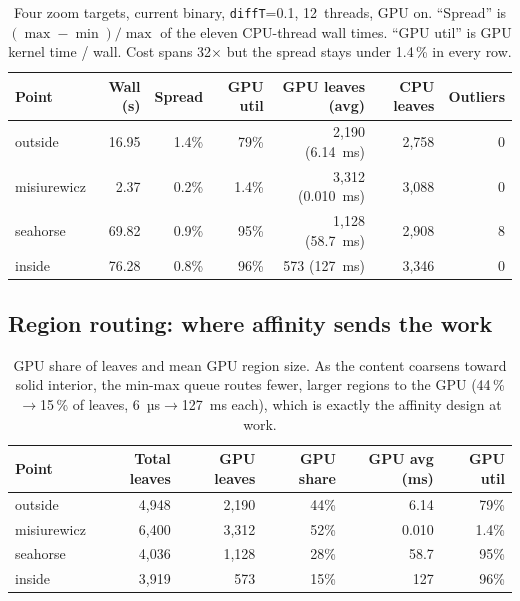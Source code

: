 \documentclass[
	english,
	letterpaper, oneside
]{article}
\begin{document}
\begin{table}[H]
    \centering
    \caption{Four zoom targets, current binary, \texttt{diffT}=0.1, 12~threads,
             GPU on. ``Spread'' is $(\max-\min)/\max$ of the eleven CPU-thread
             wall times. ``GPU util'' is GPU kernel time / wall. Cost spans
             32$\times$ but the spread stays under 1.4\,\% in every row.}
    \label{tab:char}
    \begin{tabular}{lrrrrrr}
        \hline
        Point & Wall (s) & Spread & GPU util
            & GPU leaves (avg) & CPU leaves & Outliers \\
        \hline
        outside     & 16.95 & 1.4\% & 79\%  & 2{,}190 (6.14~ms)  & 2{,}758 & 0 \\
        misiurewicz &  2.37 & 0.2\% & 1.4\% & 3{,}312 (0.010~ms) & 3{,}088 & 0 \\
        seahorse    & 69.82 & 0.9\% & 95\%  & 1{,}128 (58.7~ms)  & 2{,}908 & 8 \\
        inside      & 76.28 & 0.8\% & 96\%  &   573 (127~ms)    & 3{,}346 & 0 \\
        \hline
    \end{tabular}
\end{table}

\subsection{Region routing: where affinity sends the work}

\begin{table}[H]
    \centering
    \caption{GPU share of leaves and mean GPU region size. As the content
             coarsens toward solid interior, the min-max queue routes
             fewer, larger regions to the GPU (44\,\%$\to$15\,\% of leaves,
             6~µs$\to$127~ms each), which is exactly the affinity design at work.}
    \label{tab:route}
    \begin{tabular}{lrrrrr}
        \hline
        Point & Total leaves & GPU leaves
            & GPU share & GPU avg (ms) & GPU util \\
        \hline
        outside     & 4{,}948 & 2{,}190 & 44\% & 6.14  & 79\%  \\
        misiurewicz & 6{,}400 & 3{,}312 & 52\% & 0.010 & 1.4\% \\
        seahorse    & 4{,}036 & 1{,}128 & 28\% & 58.7  & 95\%  \\
        inside      & 3{,}919 &   573   & 15\% & 127   & 96\%  \\
        \hline
    \end{tabular}
\end{table}
\end{document}
